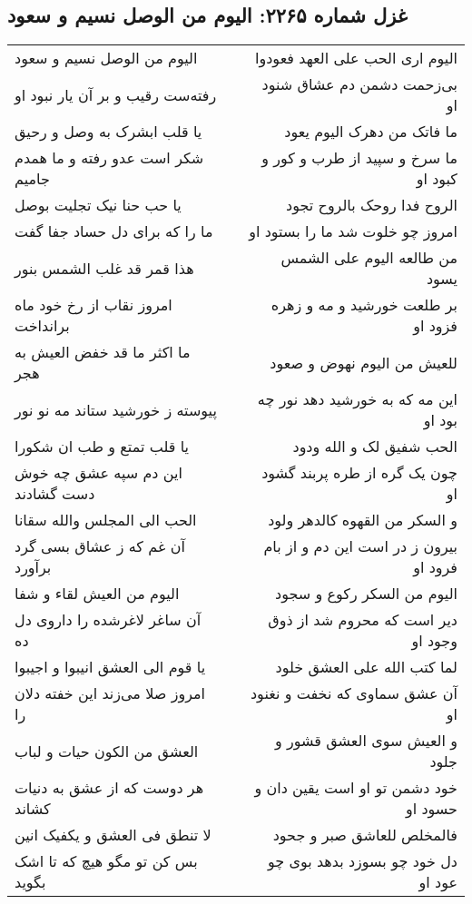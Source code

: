 \begin{center}
\section*{غزل شماره ۲۲۶۵: الیوم من الوصل نسیم و سعود}
\label{sec:2265}
\begin{longtable}{l p{0.5cm} r}
الیوم من الوصل نسیم و سعود
&&
الیوم اری الحب علی العهد فعودوا
\\
رفته‌ست رقیب و بر آن یار نبود او
&&
بی‌زحمت دشمن دم عشاق شنود او
\\
یا قلب ابشرک به وصل و رحیق
&&
ما فاتک من دهرک الیوم یعود
\\
شکر است عدو رفته و ما همدم جامیم
&&
ما سرخ و سپید از طرب و کور و کبود او
\\
یا حب حنا نیک تجلیت بوصل
&&
الروح فدا روحک بالروح تجود
\\
ما را که برای دل حساد جفا گفت
&&
امروز چو خلوت شد ما را بستود او
\\
هذا قمر قد غلب الشمس بنور
&&
من طالعه الیوم علی الشمس یسود
\\
امروز نقاب از رخ خود ماه برانداخت
&&
بر طلعت خورشید و مه و زهره فزود او
\\
ما اکثر ما قد خفض العیش به هجر
&&
للعیش من الیوم نهوض و صعود
\\
پیوسته ز خورشید ستاند مه نو نور
&&
این مه که به خورشید دهد نور چه بود او
\\
یا قلب تمتع و طب ان شکورا
&&
الحب شفیق لک و الله ودود
\\
این دم سپه عشق چه خوش دست گشادند
&&
چون یک گره از طره پربند گشود او
\\
الحب الی المجلس والله سقانا
&&
و السکر من القهوه کالدهر ولود
\\
آن غم که ز عشاق بسی گرد برآورد
&&
بیرون ز در است این دم و از بام فرود او
\\
الیوم من العیش لقاء و شفا
&&
الیوم من السکر رکوع و سجود
\\
آن ساغر لاغرشده را داروی دل ده
&&
دیر است که محروم شد از ذوق وجود او
\\
یا قوم الی العشق انیبوا و اجیبوا
&&
لما کتب الله علی العشق خلود
\\
امروز صلا می‌زند این خفته دلان را
&&
آن عشق سماوی که نخفت و نغنود او
\\
العشق من الکون حیات و لباب
&&
و العیش سوی العشق قشور و جلود
\\
هر دوست که از عشق به دنیات کشاند
&&
خود دشمن تو او است یقین دان و حسود او
\\
لا تنطق فی العشق و یکفیک انین
&&
فالمخلص للعاشق صبر و جحود
\\
بس کن تو مگو هیچ که تا اشک بگوید
&&
دل خود چو بسوزد بدهد بوی چو عود او
\\
\end{longtable}
\end{center}
